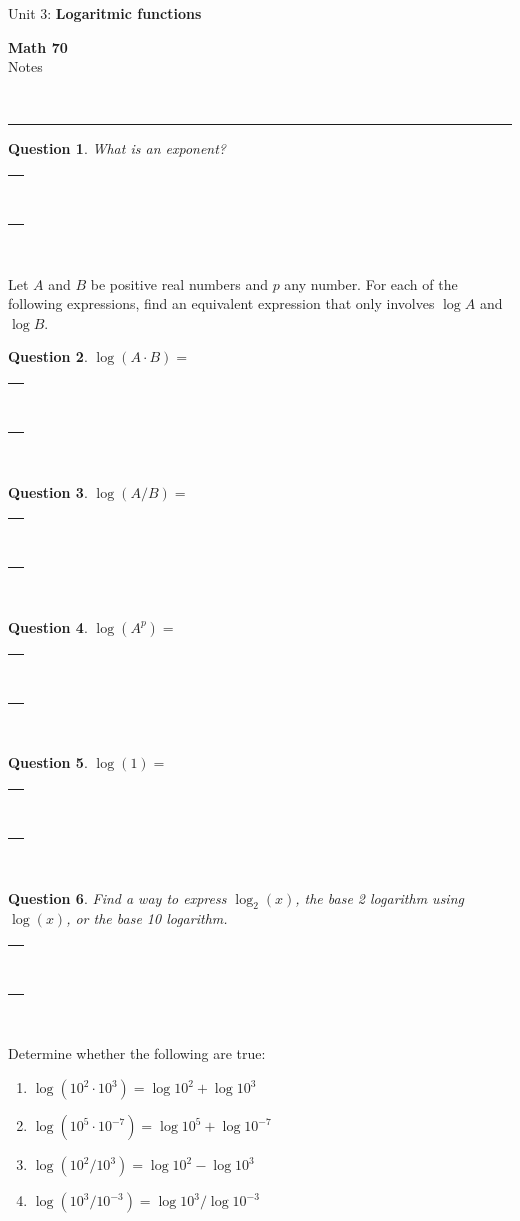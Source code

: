\documentclass[11pt]{amsart}
\newcommand{\HRule}{\rule{\linewidth}{0.5mm}}
\newtheorem*{quest}{Question}
\newcommand{\Bansbox}{
\begin{center}  
\begin{tabular}{|c|}        %
\hline
\hspace{4.5in} \\
\hspace{4.5in} \\
\hspace{4.5in} \\
\hspace{4.5in} \\
\hspace{4.5in} \\
\hspace{4.5in} \\
\hspace{4.5in} \\
\hspace{4.5in} \\
\hline
\end{tabular}\\
\end{center}}
\begin{document}
\begin{minipage}{0.4\textwidth}
\begin{flushleft} \large
Unit 3: {\bf Logaritmic functions}
\end{flushleft}
\end{minipage}
\begin{minipage}{0.6\textwidth}
\begin{flushright} \Large
{\bf Math 70 }  \\
Notes
\end{flushright}
\end{minipage}\\

\HRule


\begin{quest} What is an exponent? \end{quest}\Bansbox


Let $A$ and $B$ be positive real numbers and $p$ any number.  For each of the following expressions, find
an equivalent expression that only involves $\log A$ and $\log B$.  \\

\begin{quest} $\log(A\cdot B) = $ \end{quest} \Bansbox

\begin{quest} $\log(A/B) = $ \end{quest} \Bansbox

\newpage
\begin{quest} $\log(A^p) = $ \end{quest} \Bansbox

\begin{quest} $\log(1) = $ \end{quest} \Bansbox

\begin{quest} Find a way to express $\log_2(x)$, the base 2 logarithm using $\log(x)$, or the base 10 logarithm. \end{quest}\Bansbox


Determine whether the following are true:\\
\begin{enumerate}
\item $ \log(10^2 \cdot 10^3 ) = \log 10^2 + \log 10^3 $\\
\item $ \log(10^5\cdot 10^{-7} ) = \log 10^5 + \log 10^{-7} $\\
\item $\log(10^2/10^3) = \log 10^2 - \log 10^3 $\\
\item $ \log(10^3/10^{-3}) = \log 10^3/\log 10^{-3}$
\end{enumerate}
\end{document}
